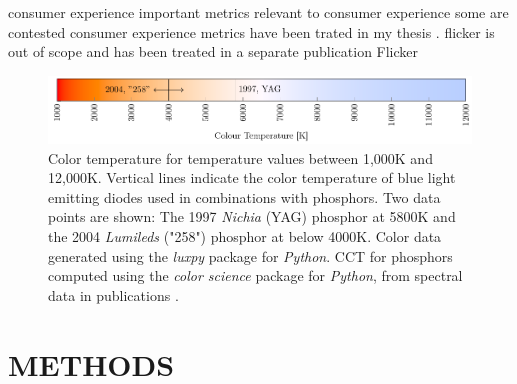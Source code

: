 \documentclass[a4paper,nocompress]{spie}  %
\begin{document}
consumer experience important
metrics relevant to consumer experience
some are contested
consumer experience metrics have been trated in my thesis \cite{weinold2020technology}.
flicker is out of scope and has been treated in a separate publication
Flicker \cite{weinold2020long}

\begin{figure} [ht]
    \begin{center}
        \includegraphics[width=\textwidth]{SPIE/article/cct_spectrum.pdf}
    \end{center}
    \caption{Color temperature for temperature values between 1,000K and 12,000K. Vertical lines indicate the color temperature of blue light emitting diodes used in combinations with phosphors. Two data points are shown: The 1997 \textit{Nichia}  (YAG) phosphor at 5800K and the 2004 \textit{Lumileds}  ("258") phosphor at below 4000K. Color data generated using the \textit{luxpy} package for \textit{Python}. CCT for phosphors computed using the \textit{color science} package for \textit{Python}, from spectral data in publications  \cite{bando1998development,MuellerMach2005}.}
    \label{fig:cct}
\end{figure}

\clearpage
\section{METHODS}
\label{sec:methods}
\end{document}
